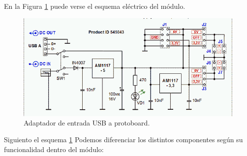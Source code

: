 En la Figura \ref{figura:alimentador_usb_protoboard_esquema} puede verse el esquema eléctrico del módulo.\\

\begin{figure}[H]
  \begin{center}
    \includegraphics[scale=0.5]{imagenes/esquema_alimentador_protoboard.png}
  \end{center}
  \caption{Adaptador de entrada USB a protoboard.}
  \label{figura:alimentador_usb_protoboard_esquema}
\end{figure}

Siguiento el esquema \ref{figura:alimentador_usb_protoboard_esquema} Podemos diferenciar los distintos componentes según su funcionalidad dentro del módulo:

